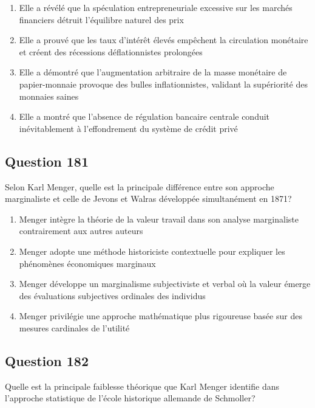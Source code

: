 \documentclass[12pt,a4paper]{article}
\begin{document}
\begin{enumerate}[label=\Alph*., leftmargin=*]
\item Elle a révélé que la spéculation entrepreneuriale excessive sur les marchés financiers détruit l'équilibre naturel des prix
\item Elle a prouvé que les taux d'intérêt élevés empêchent la circulation monétaire et créent des récessions déflationnistes prolongées
\item Elle a démontré que l'augmentation arbitraire de la masse monétaire de papier-monnaie provoque des bulles inflationnistes, validant la supériorité des monnaies saines
\item Elle a montré que l'absence de régulation bancaire centrale conduit inévitablement à l'effondrement du système de crédit privé
\end{enumerate}

\bigskip


\subsection*{Question 181}
Selon Karl Menger, quelle est la principale différence entre son approche marginaliste et celle de Jevons et Walras développée simultanément en 1871?

\begin{enumerate}[label=\Alph*., leftmargin=*]
\item Menger intègre la théorie de la valeur travail dans son analyse marginaliste contrairement aux autres auteurs
\item Menger adopte une méthode historiciste contextuelle pour expliquer les phénomènes économiques marginaux
\item Menger développe un marginalisme subjectiviste et verbal où la valeur émerge des évaluations subjectives ordinales des individus
\item Menger privilégie une approche mathématique plus rigoureuse basée sur des mesures cardinales de l'utilité
\end{enumerate}

\bigskip


\subsection*{Question 182}
Quelle est la principale faiblesse théorique que Karl Menger identifie dans l'approche statistique de l'école historique allemande de Schmoller?
\end{document}
